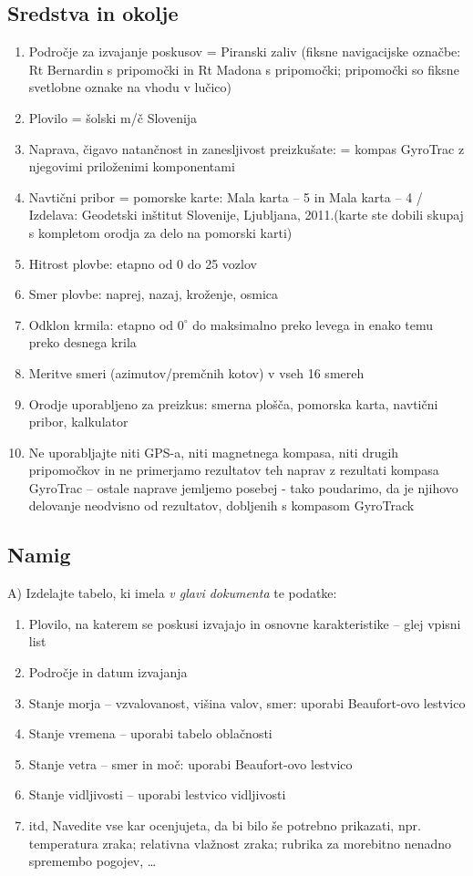 \subsection{Sredstva in okolje}
\label{subsec:Izvaj_SredOkol}
\begin{enumerate}
	\item	Področje za izvajanje poskusov = Piranski zaliv (fiksne navigacijske označbe: Rt Bernardin s pripomočki in Rt Madona s pripomočki; pripomočki so fiksne svetlobne oznake na vhodu v lučico)
	\item	Plovilo = šolski m/č Slovenija
	\item	Naprava, čigavo natančnost in zanesljivost preizkušate: = kompas GyroTrac z njegovimi priloženimi komponentami
	\item	Navtični pribor = pomorske karte: Mala karta – 5 in Mala karta – 4 / Izdelava: Geodetski inštitut Slovenije, Ljubljana, 2011.(karte ste dobili skupaj s kompletom orodja za delo na pomorski karti)
	\item	Hitrost plovbe: etapno od 0 do 25 vozlov
	\item	Smer plovbe: naprej, nazaj, kroženje, osmica
	\item	Odklon krmila: etapno od $0^\circ$ do maksimalno preko levega in enako temu preko desnega krila
	\item	Meritve smeri (azimutov/premčnih kotov) v vseh 16 smereh
	\item	Orodje uporabljeno za preizkus: smerna plošča, pomorska karta, navtični pribor, kalkulator
	\item	Ne uporabljajte niti GPS-a, niti magnetnega kompasa, niti drugih pripomočkov in ne primerjamo rezultatov teh naprav z rezultati kompasa GyroTrac – ostale naprave jemljemo posebej - tako poudarimo, da je njihovo delovanje neodvisno od rezultatov, dobljenih s kompasom GyroTrack 
\end{enumerate}

\subsection{Namig}
\label{subsec:Izvaj_Namig}
A) Izdelajte tabelo, ki imela \textit{v glavi dokumenta} te podatke:
\begin{enumerate}
	\item	Plovilo, na katerem se poskusi izvajajo in osnovne karakteristike – glej vpisni list
	\item	Področje in datum izvajanja
	\item	Stanje morja – vzvalovanost, višina valov, smer: uporabi Beaufort-ovo lestvico
	\item	Stanje vremena – uporabi tabelo oblačnosti
	\item	Stanje vetra – smer in moč: uporabi Beaufort-ovo lestvico
	\item	Stanje vidljivosti – uporabi lestvico vidljivosti
    \item   itd, Navedite vse kar ocenjujeta, da bi bilo še potrebno prikazati, npr. temperatura zraka; relativna vlažnost zraka; rubrika za morebitno nenadno spremembo pogojev, … 
\end{enumerate}

